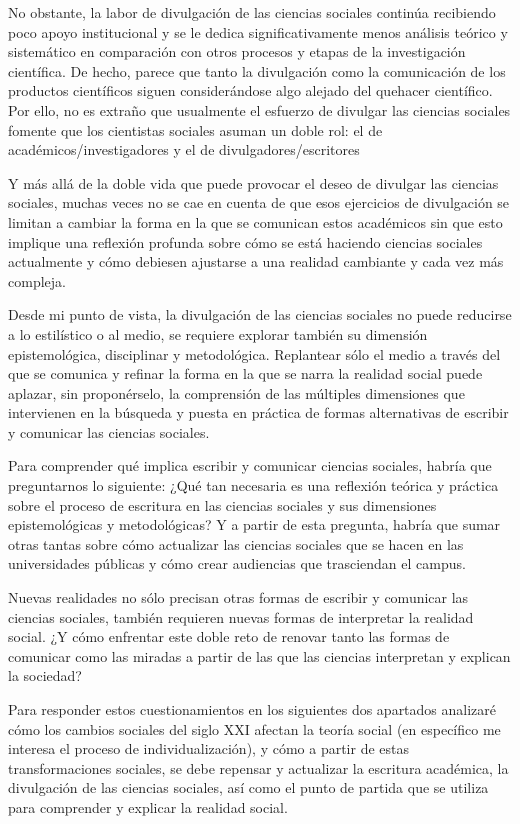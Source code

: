 \documentclass[
  spanish,
  11pt,
  a4paper,
]{scrbook}
\begin{document}
No obstante, la labor de divulgación de las ciencias sociales continúa
recibiendo poco apoyo institucional y se le dedica significativamente
menos análisis teórico y sistemático en comparación con otros procesos y
etapas de la investigación científica. De hecho, parece que tanto la
divulgación como la comunicación de los productos científicos siguen
considerándose algo alejado del quehacer científico. Por ello, no es
extraño que usualmente el esfuerzo de divulgar las ciencias sociales
fomente que los cientistas sociales asuman un doble rol: el de
académicos/investigadores y el de divulgadores/escritores

Y más allá de la doble vida que puede provocar el deseo de divulgar las
ciencias sociales, muchas veces no se cae en cuenta de que esos
ejercicios de divulgación se limitan a cambiar la forma en la que se
comunican estos académicos sin que esto implique una reflexión profunda
sobre cómo se está haciendo ciencias sociales actualmente y cómo
debiesen ajustarse a una realidad cambiante y cada vez más compleja.

Desde mi punto de vista, la divulgación de las ciencias sociales no
puede reducirse a lo estilístico o al medio, se requiere explorar
también su dimensión epistemológica, disciplinar y metodológica.
Replantear sólo el medio a través del que se comunica y refinar la forma
en la que se narra la realidad social puede aplazar, sin proponérselo,
la comprensión de las múltiples dimensiones que intervienen en la
búsqueda y puesta en práctica de formas alternativas de escribir y
comunicar las ciencias sociales.

Para comprender qué implica escribir y comunicar ciencias sociales,
habría que preguntarnos lo siguiente: ¿Qué tan necesaria es una
reflexión teórica y práctica sobre el proceso de escritura en las
ciencias sociales y sus dimensiones epistemológicas y metodológicas? Y a
partir de esta pregunta, habría que sumar otras tantas sobre cómo
actualizar las ciencias sociales que se hacen en las universidades
públicas y cómo crear audiencias que trasciendan el campus.

Nuevas realidades no sólo precisan otras formas de escribir y comunicar
las ciencias sociales, también requieren nuevas formas de interpretar la
realidad social. ¿Y cómo enfrentar este doble reto de renovar tanto las
formas de comunicar como las miradas a partir de las que las ciencias
interpretan y explican la sociedad?

Para responder estos cuestionamientos en los siguientes dos apartados
analizaré cómo los cambios sociales del siglo XXI afectan la teoría
social (en específico me interesa el proceso de individualización), y
cómo a partir de estas transformaciones sociales, se debe repensar y
actualizar la escritura académica, la divulgación de las ciencias
sociales, así como el punto de partida que se utiliza para comprender y
explicar la realidad social.
\end{document}
